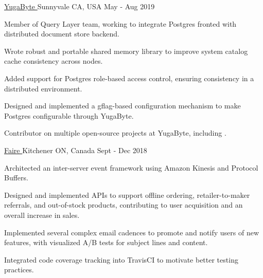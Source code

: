 
\begin{cventries}

  {\href{https://www.yugabyte.com}{YugaByte \faExternalLink}} {Sunnyvale CA,
    USA} {May - Aug 2019} {
    \begin{cvitems}
    \item Member of Query Layer team, working to integrate Postgres fronted with
      distributed document store backend.
    \item Wrote robust and portable shared memory library to improve system
      catalog cache consistency across nodes.
    \item Added support for Postgres role-based access control, ensuring
      consistency in a distributed environment.
    \item Designed and implemented a gflag-based configuration mechanism to make
      Postgres configurable through YugaByte.  
    \item Contributor on multiple open-source projects at YugaByte, including
      \thinspace
      \href{https://github.com/YugaByte/yugabyte-db/commits?author=srhickma}{\color[HTML]{3090C7}{yugabyte-db
          \faExternalLink}}.
    \end{cvitems}
  }

  {\href{https://www.faire.com}{Faire \faExternalLink}} {Kitchener ON, Canada}
  {Sept - Dec 2018} {
    \begin{cvitems}
    \item Architected an inter-server event framework using Amazon Kinesis and
      Protocol Buffers.
    \item Designed and implemented APIs to support offline ordering,
      retailer-to-maker referrals, and out-of-stock products, contributing to
      user acquisition and an overall increase in sales.
    \item Implemented several complex email cadences to promote and notify users
      of new features, with visualized A/B tests for subject lines and content.
       
    \item Integrated code coverage tracking into TravisCI to motivate better
      testing practices.
    \end{cvitems}
  }
    

\end{cventries}
